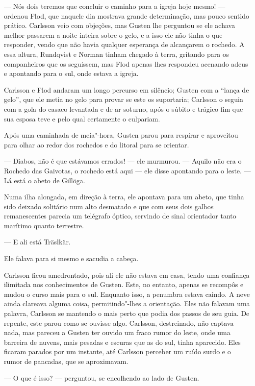 --- Nós dois teremos que concluir o caminho para a igreja hoje mesmo! --- ordenou
Flod, que naquele dia mostrava grande determinação, mas pouco sentido prático.
Carlsson veio com objeções, mas Gusten lhe perguntou se ele achava melhor
passarem a noite inteira sobre o gelo, e a isso ele não tinha o que responder,
vendo que não havia qualquer esperança de alcançarem o rochedo. A essa altura,
Rundqvist e Norman tinham chegado à terra, gritando para os companheiros que os
seguissem, mas Flod apenas lhes respondeu acenando adeus e apontando para o
sul, onde estava a igreja.

Carlsson e Flod andaram um longo percurso em silêncio; Gusten com a ``lança de
gelo'', que ele metia no gelo para provar se este os suportaria; Carlsson o
seguia com a gola do casaco levantada e de ar soturno, após o súbito e trágico
fim que sua esposa teve e pelo qual certamente o culpariam.

Após uma caminhada de meia"-hora, Gusten parou para respirar e aproveitou
para olhar ao redor dos rochedos e do litoral para se orientar.

--- Diabos, não é que estávamos errados! --- ele murmurou. --- Aquilo não era o
Rochedo das Gaivotas, o rochedo está aqui --- ele disse apontando para o leste.
--- Lá está o abeto de Gillöga.

Numa ilha alongada, em direção à terra, ele apontava para um abeto, que tinha
sido deixado solitário num alto desmatado e que com seus dois galhos
remanescentes parecia um telégrafo óptico, servindo de sinal orientador tanto
marítimo quanto terrestre.

--- E ali está Träslkär.

Ele falava para si mesmo e sacudia a cabeça.

Carlsson ficou amedrontado, pois ali ele não estava em casa, tendo uma confiança
ilimitada nos conhecimentos de Gusten. Este, no entanto, apenas se recompôs e
mudou o curso mais para o sul. Enquanto isso, a penumbra estava caindo. A neve
ainda clareava alguma coisa, permitindo"-lhes a orientação. Eles não falavam uma
palavra, Carlsson se mantendo o mais perto que podia dos passos de seu guia. De
repente, este parou como se ouvisse algo. Carlsson, destreinado,  não captava
nada, mas pareceu a Gusten ter ouvido um fraco rumor do leste, onde
uma barreira de nuvens, mais pesadas e escuras que as do sul, tinha aparecido.
Eles ficaram parados por um instante, até Carlsson perceber um ruído surdo e
o rumor de pancadas, que se aproximavam.

--- O que é isso? --- perguntou, se encolhendo ao lado de Gusten.

